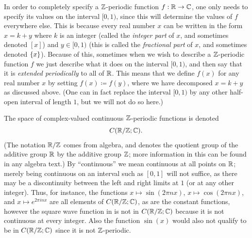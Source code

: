 \begin{note}
  In order to completely specify a \(\mathbb{Z}\)-periodic function \(f : \mathbb{R} \to \mathbb{C}\), one only needs to specify its values on the interval \([0, 1)\), since this will determine the values of \(f\) everywhere else.
  This is because every real number \(x\) can be written in the form \(x = k + y\) where \(k\) is an integer (called the \emph{integer part} of \(x\), and sometimes denoted \([x]\)) and \(y \in [0, 1)\) (this is called the \emph{fractional part} of \(x\), and sometimes denoted \(\left\lbrace x\right\rbrace\)).
  Because of this, sometimes when we wish to describe a \(\mathbb{Z}\)-periodic function \(f\) we just describe what it does on the interval \([0, 1)\), and then say that it is \emph{extended periodically} to all of \(\mathbb{R}\).
  This means that we define \(f(x)\) for any real number \(x\) by setting \(f(x) \coloneqq f(y)\), where we have decomposed \(x = k + y\) as discussed above.
  (One can in fact replace the interval \([0, 1)\) by any other half-open interval of length \(1\), but we will not do so here.)
\end{note}

\begin{note}
  The space of complex-valued continuous \(\mathbb{Z}\)-periodic functions is denoted
  \[
    C(\mathbb{R} / \mathbb{Z} ; \mathbb{C}).
  \]
  (The notation \(\mathbb{R} / \mathbb{Z}\) comes from algebra, and denotes the quotient group of the additive group \(\mathbb{R}\) by the additive group \(\mathbb{Z}\);
  more information in this can be found in any algebra text.)
  By ``continuous'' we mean continuous at all points on \(\mathbb{R}\);
  merely being continuous on an interval such as \([0, 1]\) will not suffice, as there may be a discontinuity between the left and right limits at \(1\) (or at any other integer).
  Thus, for instance, the functions \(x \mapsto \sin(2 \pi n x)\), \(x \mapsto \cos(2 \pi n x)\), and \(x \mapsto e^{2 \pi i n x}\) are all elements of \(C(\mathbb{R} / \mathbb{Z} ; \mathbb{C})\), as are the constant functions, however the square wave function in  is not in \(C(\mathbb{R} / \mathbb{Z} ; \mathbb{C})\) because it is not continuous at every integer.
  Also the function \(\sin(x)\) would also not qualify to be in \(C(\mathbb{R} / \mathbb{Z} ; \mathbb{C})\) since it is not \(\mathbb{Z}\)-periodic.
\end{note}

